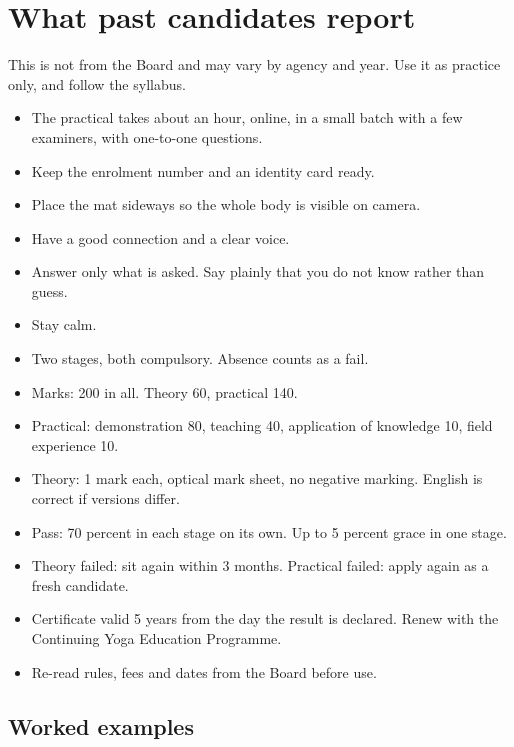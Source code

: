 \section*{What past candidates report}

This is not from the Board and may vary by agency and year. Use it as practice only, and follow the syllabus.
\begin{itemize}
\item The practical takes about an hour, online, in a small batch with a few examiners, with one-to-one questions.
\item Keep the enrolment number and an identity card ready.
\item Place the mat sideways so the whole body is visible on camera.
\item Have a good connection and a clear voice.
\item Answer only what is asked. Say plainly that you do not know rather than guess.
\item Stay calm.
\end{itemize}

\begin{recall}
\begin{itemize}
\item Two stages, both compulsory. Absence counts as a fail.
\item Marks: 200 in all. Theory 60, practical 140.
\item Practical: demonstration 80, teaching 40, application of knowledge 10, field experience 10.
\item Theory: 1 mark each, optical mark sheet, no negative marking. English is correct if versions differ.
\item Pass: 70 percent in each stage on its own. Up to 5 percent grace in one stage.
\item Theory failed: sit again within 3 months. Practical failed: apply again as a fresh candidate.
\item Certificate valid 5 years from the day the result is declared. Renew with the Continuing Yoga Education Programme.
\item Re-read rules, fees and dates from the Board before use.
\end{itemize}
\end{recall}

\subsection*{Worked examples}

